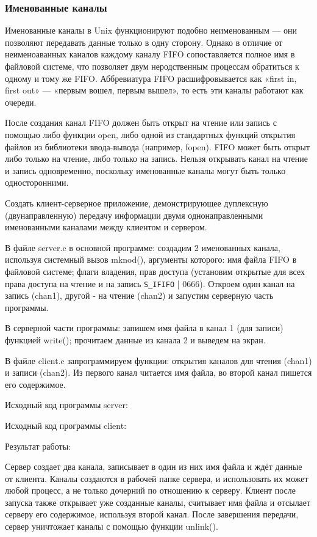 \documentclass[a4paper]{article}
\begin{document}
	\subsubsection{Именованные каналы}
	Именованные каналы в Unix функционируют подобно неименованным — они позволяют передавать данные только в одну сторону. Однако в отличие от неименоаванных каналов каждому каналу FIFO сопоставляется полное имя в файловой системе, что позволяет двум неродственным процессам обратиться к одному и тому же FIFO. Аббревиатура FIFO расшифровывается как «first in, first out» — «первым вошел, первым вышел», то есть эти каналы работают как очереди.
	
	После создания канал FIFO должен быть открыт на чтение или запись с помощью либо функции open, либо одной из стандартных функций открытия файлов из библиотеки ввода-вывода (например, fopen). FIFO может быть открыт либо только на чтение, либо только на запись. Нельзя открывать канал на чтение и запись одновременно, поскольку именованные каналы могут быть только односторонними.

	Создать клиент-серверное приложение, демонстрирующее дуплексную (двунаправленную) передачу информации двумя однонаправленными именованными каналами между клиентом и сервером.
	
	В файле server.c в основной программе: создадим 2 именованных канала, используя системный вызов mknod(), аргументы которого: имя файла FIFO в файловой системе; флаги владения, прав доступа (установим открытые для всех права доступа на чтение и на запись \texttt{S\_IFIFO} | 0666). Откроем один канал на запись (chan1), другой - на чтение (chan2) и запустим серверную часть программы.
	
	В серверной части программы: запишем имя файла в канал 1 (для записи) функцией write(); прочитаем данные из канала 2 и выведем на экран.

	В файле client.c запрограммируем функции: открытия каналов для чтения (chan1) и записи (chan2). Из первого канал читается имя файла, во второй канал пишется его содержимое.
	
	Исходный код программы server:
	
		
	Исходный код программы client:
	
	
	Результат работы:
	
	
	Сервер создает два канала, записывает в один из них имя файла и ждёт данные от клиента. Каналы создаются в рабочей папке сервера, и использовать их может любой процесс, а не только дочерний по отношению к серверу. Клиент после запуска также открывает уже созданные каналы, считывает имя файла и отсылает серверу его содержимое, используя второй канал. После завершения передачи, сервер уничтожает каналы с помощью функции unlink().
	
\end{document}
